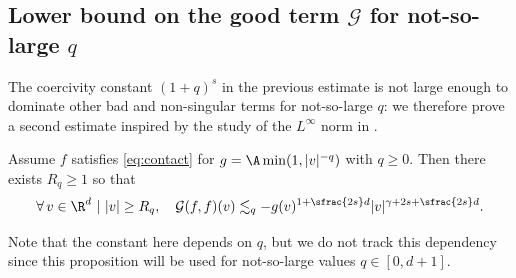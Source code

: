\subsection{Lower bound on the good term $\mathcal{G}$ for
not-so-large $q$}

The coercivity constant $(1+q)^s$ in the previous estimate is not
large enough to dominate other bad and non-singular terms for
not-so-large $q$: we therefore prove a second estimate inspired by the
study of the $L^\infty$ norm in \cite{luis}.

\begin{prop} \label{prop:G} Assume $f$ satisfies \eqref{eq:contact} for
$g = \A \min(1,|v|^{-q})$ with $q \ge 0$. Then there exists
$R_q \geq 1$ so that
\[ \forall \, v \in \R^d \ | \ |v| \ge R_q, \quad \mathcal{G}
(f,f)(v) \lesssim_q - g(v)^{1+\sfrac{2s}d}
|v|^{\gamma+2s+\sfrac{2s}d}.
\]
\end{prop}
\begin{remark}
Note that the constant here depends on $q$, but we do not track this
dependency since this proposition will be used for not-so-large
values $q \in [0,d+1]$.
\end{remark}

